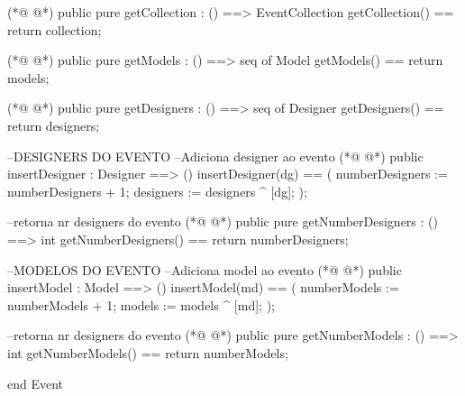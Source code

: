 \begin{vdmpp}[breaklines=true]
(*@
\label{getCollection:74}
@*)
  public pure getCollection : () ==> EventCollection
     getCollection() == return collection;
  
(*@
\label{getModels:77}
@*)
  public pure getModels : () ==> seq of Model
     getModels() == return models;
     
(*@
\label{getDesigners:80}
@*)
  public pure getDesigners : () ==> seq of Designer
     getDesigners() == return designers;
 
 --DESIGNERS DO EVENTO 
 --Adiciona designer ao evento
(*@
\label{insertDesigner:85}
@*)
 public insertDesigner : Designer ==> ()
  insertDesigner(dg) ==
  (
    numberDesigners := numberDesigners + 1;
    designers := designers ^  [dg];
  );
  
 --retorna nr designers do evento
(*@
\label{getNumberDesigners:93}
@*)
  public pure getNumberDesigners : () ==> int
  getNumberDesigners() == return numberDesigners;
  
  --MODELOS DO EVENTO
  --Adiciona model ao evento
(*@
\label{insertModel:98}
@*)
 public insertModel : Model ==> ()
  insertModel(md) ==
  (
    numberModels := numberModels + 1;
    models := models ^  [md];
  );
  
  --retorna nr designers do evento
(*@
\label{getNumberModels:106}
@*)
  public pure getNumberModels : () ==> int
  getNumberModels() == return numberModels;
 
end Event
\end{vdmpp}
\bigskip
